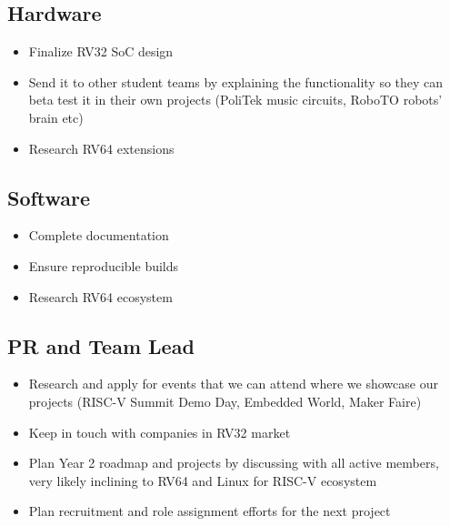 \documentclass{article}
\begin{document}
\subsection{Hardware}
\begin{itemize}
    \item Finalize RV32 SoC design
    \item Send it to other student teams by explaining the functionality so they can beta test it in their own projects (PoliTek music circuits, RoboTO robots' brain etc)
    \item Research RV64 extensions
\end{itemize}

\subsection{Software}
\begin{itemize}
    \item Complete documentation
    \item Ensure reproducible builds
    \item Research RV64 ecosystem
\end{itemize}

\subsection{PR and Team Lead}
\begin{itemize}
    \item Research and apply for events that we can attend where we showcase our projects (RISC-V Summit Demo Day, Embedded World, Maker Faire)
    \item Keep in touch with companies in RV32 market
    \item Plan Year 2 roadmap and projects by discussing with all active members, very likely inclining to RV64 and Linux for RISC-V ecosystem
    \item Plan recruitment and role assignment efforts for the next project
\end{itemize}
\end{document}
